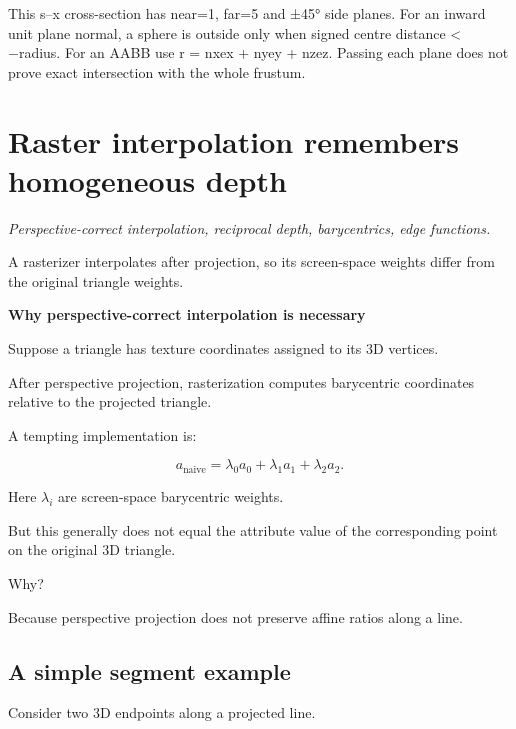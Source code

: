 This s--x cross-section has near=1, far=5 and ±45° side planes. For an inward unit plane normal, a sphere is outside only when signed centre distance \textless{} −radius. For an AABB use r = \textbar nx\textbar ex + \textbar ny\textbar ey + \textbar nz\textbar ez. Passing each plane does not prove exact intersection with the whole frustum.

\section{Raster interpolation remembers homogeneous depth}\label{02-foundations-ii-ch034-raster-interpolation-remembers-homogeneous-depth}

\hypertarget{02-foundations-ii-ch034-raster-interpolation-remembers-homogeneous-depth}{}

\emph{Perspective-correct interpolation, reciprocal depth, barycentrics, edge functions.}

A rasterizer interpolates after projection, so its screen-space weights differ from the original triangle weights.

\textbf{Why perspective-correct interpolation is necessary}

Suppose a triangle has texture coordinates assigned to its 3D vertices.

After perspective projection, rasterization computes barycentric coordinates relative to the projected triangle.

A tempting implementation is:

\[
 \boxed{ a_{\mathrm{naive}}= \lambda_0a_0+\lambda_1a_1+\lambda_2a_2 }.
\]

Here \(\lambda_i\) are screen-space barycentric weights.

But this generally does not equal the attribute value of the corresponding point on the original 3D triangle.

Why?

Because perspective projection does not preserve affine ratios along a line.

\subsection{A simple segment example}\label{02-foundations-ii-ch034-a-simple-segment-example}

\hypertarget{02-foundations-ii-ch034-a-simple-segment-example}{}

Consider two 3D endpoints along a projected line.

